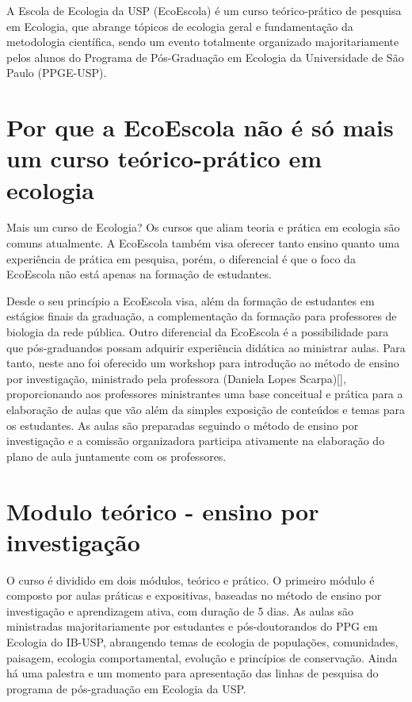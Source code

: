 \documentclass[
]{book}
\begin{document}
A Escola de Ecologia da USP (EcoEscola) é um curso teórico-prático de pesquisa em Ecologia, que abrange tópicos de ecologia geral e fundamentação da metodologia científica, sendo um evento totalmente organizado majoritariamente pelos alunos do Programa de Pós-Graduação em Ecologia da Universidade de São Paulo (PPGE-USP).

\section{Por que a EcoEscola não é só mais um curso teórico-prático em ecologia}\label{por-que-a-ecoescola-nuxe3o-uxe9-suxf3-mais-um-curso-teuxf3rico-pruxe1tico-em-ecologia}

Mais um curso de Ecologia? Os cursos que aliam teoria e prática em ecologia são comuns atualmente. A EcoEscola também visa oferecer tanto ensino quanto uma experiência de prática em pesquisa, porém, o diferencial é que o foco da EcoEscola não está apenas na formação de estudantes.

Desde o seu princípio a EcoEscola visa, além da formação de estudantes em estágios finais da graduação, a complementação da formação para professores de biologia da rede pública. Outro diferencial da EcoEscola é a possibilidade para que pós-graduandos possam adquirir experiência didática ao ministrar aulas. Para tanto, neste ano foi oferecido um workshop para introdução ao método de ensino por investigação, ministrado pela professora (Daniela Lopes Scarpa){[}{]}, proporcionando aos professores ministrantes uma base conceitual e prática para a elaboração de aulas que vão além da simples exposição de conteúdos e temas para os estudantes. As aulas são preparadas seguindo o método de ensino por investigação e a comissão organizadora participa ativamente na elaboração do plano de aula juntamente com os professores.

\section{Modulo teórico - ensino por investigação}\label{modulo-teuxf3rico---ensino-por-investigauxe7uxe3o}

O curso é dividido em dois módulos, teórico e prático. O primeiro módulo é composto por aulas práticas e expositivas, baseadas no método de ensino por investigação e aprendizagem ativa, com duração de 5 dias. As aulas são ministradas majoritariamente por estudantes e pós-doutorandos do PPG em Ecologia do IB-USP, abrangendo temas de ecologia de populações, comunidades, paisagem, ecologia comportamental, evolução e princípios de conservação. Ainda há uma palestra e um momento para apresentação das linhas de pesquisa do programa de pós-graduação em Ecologia da USP.
\end{document}
